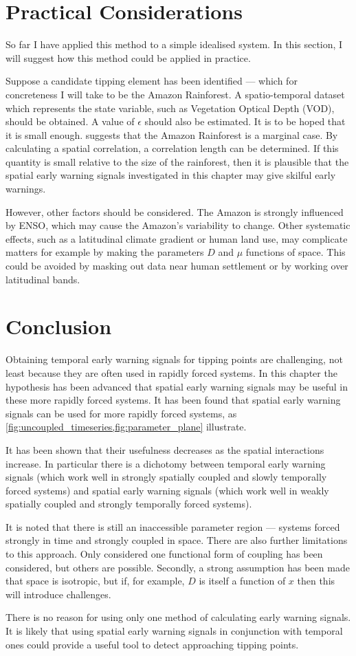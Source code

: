 \section{Practical Considerations}
So far I have applied this method to a simple idealised system. In this section, I will suggest how this method could be applied in practice.

Suppose a candidate tipping element has been identified --- which for concreteness I will take to be the Amazon Rainforest. A spatio-temporal
dataset which represents the state variable, such as Vegetation Optical Depth (VOD), should be obtained. A value of $\epsilon$ should also be estimated. It is to be
hoped that it is small enough.  suggests that the Amazon Rainforest is a marginal case. By calculating a
spatial correlation, a correlation length can be determined. If this quantity is small relative to the size of the rainforest, then it
is plausible that the spatial early warning signals investigated in this chapter may give skilful early warnings.

However, other factors should be considered. The Amazon is strongly influenced by ENSO, which may cause the Amazon's
variability to change. Other systematic effects, such as a latitudinal climate gradient or human land use, may complicate matters for
example by making the parameters $D$ and $\mu$ functions of space. This could be avoided by masking out data near human settlement
or by working over latitudinal bands.


\section{Conclusion}

Obtaining temporal early warning signals for tipping points are challenging, not least because they are often used in rapidly forced systems.
In this chapter the hypothesis has been advanced that spatial early warning signals may be useful in these more rapidly forced systems.
It has been found that spatial early warning signals can be used for more rapidly forced systems, as \cref{fig:uncoupled_timeseries,fig:parameter_plane}
illustrate.

It has been shown that their usefulness decreases as the spatial interactions increase.
In particular there is a dichotomy between temporal early warning signals (which work well in strongly spatially coupled and slowly temporally forced systems)
and spatial early warning signals (which work well in weakly spatially coupled and strongly temporally forced systems).

It is noted that there is still an inaccessible parameter region --- systems forced strongly in time and strongly coupled in space. There are also further limitations
to this approach.  Only considered one functional form of coupling has been considered, but others are possible. Secondly, a strong assumption has been made that space is isotropic,
but if, for example, $D$ is itself a function of $x$ then this will introduce challenges.

There is no reason for using only one method of calculating early warning signals. It is likely that using spatial early warning signals in conjunction with
temporal ones could provide a useful tool to detect approaching tipping points.
